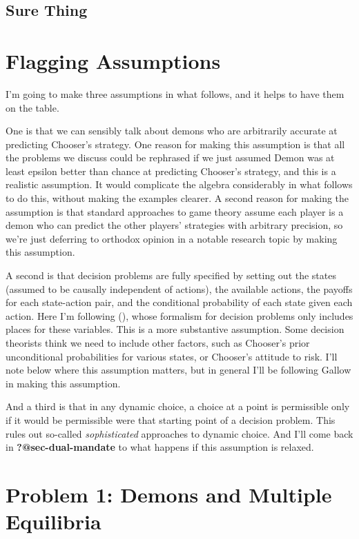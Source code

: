 \documentclass[
  10pt,
  letterpaper,
  DIV=11,
  numbers=noendperiod,
  twoside]{scrartcl}
\begin{document}
\subsection{Sure Thing}\label{sure-thing}

\section{Flagging Assumptions}\label{flagging-assumptions}

I'm going to make three assumptions in what follows, and it helps to
have them on the table.

One is that we can sensibly talk about demons who are arbitrarily
accurate at predicting Chooser's strategy. One reason for making this
assumption is that all the problems we discuss could be rephrased if we
just assumed Demon was at least epsilon better than chance at predicting
Chooser's strategy, and this is a realistic assumption. It would
complicate the algebra considerably in what follows to do this, without
making the examples clearer. A second reason for making the assumption
is that standard approaches to game theory assume each player is a demon
who can predict the other players' strategies with arbitrary precision,
so we're just deferring to orthodox opinion in a notable research topic
by making this assumption.

A second is that decision problems are fully specified by setting out
the states (assumed to be causally independent of actions), the
available actions, the payoffs for each state-action pair, and the
conditional probability of each state given each action. Here I'm
following (), whose
formalism for decision problems only includes places for these
variables. This is a more substantive assumption. Some decision
theorists think we need to include other factors, such as Chooser's
prior unconditional probabilities for various states, or Chooser's
attitude to risk. I'll note below where this assumption matters, but in
general I'll be following Gallow in making this assumption.

And a third is that in any dynamic choice, a choice at a point is
permissible only if it would be permissible were that starting point of
a decision problem. This rules out so-called \emph{sophisticated}
approaches to dynamic choice. And I'll come back in
\textbf{?@sec-dual-mandate} to what happens if this assumption is
relaxed.

\section{Problem 1: Demons and Multiple Equilibria}\label{sec-multiple}
\end{document}
